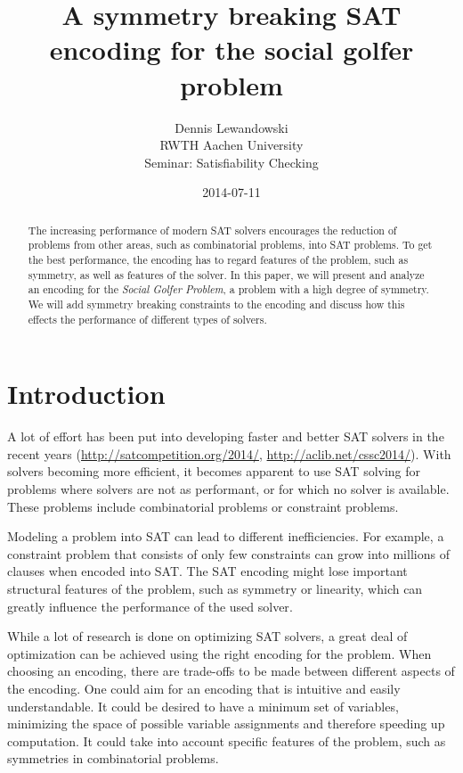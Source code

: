 \documentclass[a4paper]{scrartcl}
\title{A symmetry breaking SAT encoding for the social golfer problem}
\author{Dennis Lewandowski \\
    RWTH Aachen University \\
    Seminar: Satisfiability Checking
    }
\date{2014-07-11}
\begin{document}
\maketitle

\begin{abstract}

The increasing performance of modern SAT solvers encourages the reduction of problems from other areas, such as combinatorial problems, into SAT problems. To get the best performance, the encoding has to regard features of the problem, such as symmetry, as well as features of the solver. In this paper, we will present and analyze an encoding for the \emph{Social Golfer Problem}, a problem with a high degree of symmetry. We will add symmetry breaking constraints to the encoding and discuss how this effects the performance of different types of solvers. 

\end{abstract}

\section{Introduction}

A lot of effort has been put into developing faster and better SAT solvers in the recent years (\url{http://satcompetition.org/2014/}, \url{http://aclib.net/cssc2014/}). With solvers becoming more efficient, it becomes apparent to use SAT solving for problems where solvers are not as performant, or for which no solver is available. These problems include combinatorial problems or constraint problems.

Modeling a problem into SAT can lead to different inefficiencies. For example, a constraint problem that consists of only few constraints can grow into millions of clauses when encoded into SAT. The SAT encoding might lose important structural features of the problem, such as symmetry or linearity, which can greatly influence the performance of the used solver\cite{ramani}.

While a lot of research is done on optimizing SAT solvers, a great deal of optimization can be achieved using the right encoding for the problem. When choosing an encoding, there are trade-offs to be made between different aspects of the encoding. One could aim for an encoding that is intuitive and easily understandable. It could be desired to have a minimum set of variables, minimizing the space of possible variable assignments and therefore speeding up computation. It could take into account specific features of the problem, such as symmetries in combinatorial problems.
\end{document}
